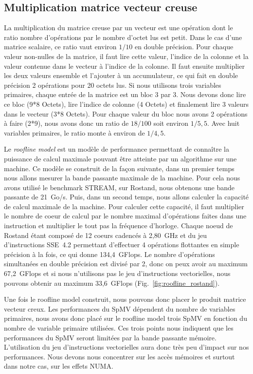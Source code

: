 \subsection{Multiplication matrice vecteur creuse}
La multiplication du matrice creuse par un vecteur est une opération dont le ratio nombre d'opérations par le nombre d'octet lus est petit.
%
Dans le cas d'une matrice scalaire, ce ratio vaut environ $1/10$ en double précision.
%
Pour chaque valeur non-nulles de la matrice, il faut lire cette valeur, l'indice de la colonne et la valeur contenue dans le vecteur à l'indice de la colonne.
%
Il faut ensuite multiplier les deux valeurs ensemble et l'ajouter à un accumulateur, ce qui fait en double précision 2 opérations pour 20 octets lus.
%
Si nous utilisons trois variables primaires, chaque entrée de la matrice est un bloc 3 par 3.
%
Nous devons donc lire ce bloc (9*8 Octets), lire l'indice de colonne (4 Octets) et finalement lire 3 valeurs dans le vecteur (3*8 Octets).
%
Pour chaque valeur du bloc nous avons 2 opérations à faire (2*9), nous avons donc un ratio de $18/100$ soit environ $1/5,5$.
%
Avec huit variables primaires, le ratio monte à environ de $1/4,5$.


Le {\em roofline model} est un modèle de performance permettant de connaître la puissance de calcul maximale pouvant être atteinte par un algorithme sur une machine.
%
Ce modèle se construit de la façon suivante, dans un premier temps nous allons mesurer la bande passante maximale de la machine.
%
Pour cela nous avons utilisé le benchmark STREAM, sur Rostand, nous obtenons une bande passante de 21~Go/s.
%
Puis, dans un second temps, nous allons calculer la capacité de calcul maximale de la machine.
%
Pour calculer cette capacité, il faut multiplier le nombre de coeur de calcul par le nombre maximal d'opérations faites dans une instruction et multiplier le tout pas la fréquence d'horloge.
%
Chaque noeud de Rostand étant composé de 12 coeurs cadencés à 2,80~GHz et du jeu d'instructions SSE~4.2 permettant d'effectuer 4 opérations flottantes en simple précision à la fois, ce qui donne 134,4~GFlops.
%
Le nombre d'opérations simultanées en double précision est divisé par 2, donc on peux avoir au maximum 67,2~GFlops et si nous n'utilisons pas le jeu d'instructions vectorielles, nous pouvons obtenir au maximum 33,6~GFlops (Fig.~\ref{fig:roofline_rostand}).


Une fois le roofline model construit, nous pouvons donc placer le produit matrice vecteur creux.
%
Les performances du SpMV dépendent du nombre de variables primaires, nous avons donc placé sur le roofline model trois SpMV en fonction du nombre de variable primaire utilisées.
%
Ces trois points nous indiquent que les performances du SpMV seront limitées par la bande passante mémoire.
%
L'utilisation du jeu d'instructions vectorielles aura donc très peu d'impact sur nos performances.
%
Nous devons nous concentrer sur les accès mémoires et surtout dans notre cas, sur les effets NUMA.


